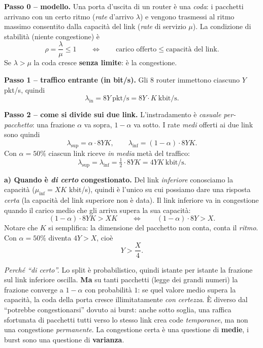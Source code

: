 \documentclass{report}
\begin{document}
\begin{solution}
\textbf{Passo 0 -- modello.} Una porta d'uscita di un router è una \emph{coda}: i
pacchetti arrivano con un certo ritmo (\emph{rate} d'arrivo $\lambda$) e vengono
trasmessi al ritmo massimo consentito dalla capacità del link (\emph{rate} di
servizio $\mu$). La condizione di stabilità (niente congestione) è
\[
\rho = \frac{\lambda}{\mu} \le 1
\qquad\Longleftrightarrow\qquad
\text{carico offerto} \le \text{capacità del link}.
\]
Se $\lambda > \mu$ la coda cresce \textbf{senza limite}: è la congestione.

\medskip
\textbf{Passo 1 -- traffico entrante (in bit/s).} Gli 8 router immettono ciascuno
$Y$ pkt/s, quindi
\[
\lambda_{\text{in}} = 8Y \ \text{pkt/s} = 8Y\cdot K \ \text{kbit/s}.
\]

\textbf{Passo 2 -- come si divide sui due link.} L'instradamento è \emph{casuale
per-pacchetto}: una frazione $\alpha$ va sopra, $1-\alpha$ va sotto. I rate
\emph{medi} offerti ai due link sono quindi
\[
\lambda_{\text{sup}} = \alpha\cdot 8YK, \qquad
\lambda_{\text{inf}} = (1-\alpha)\cdot 8YK .
\]
Con $\alpha=50\%$ ciascun link riceve \emph{in media} metà del traffico:
\[
\lambda_{\text{sup}} = \lambda_{\text{inf}} = \tfrac{1}{2}\cdot 8YK = 4YK \ \text{kbit/s}.
\]

\medskip
\noindent\textbf{a) Quando è \emph{di certo} congestionato.}
Del link \emph{inferiore} conosciamo la capacità ($\mu_{\text{inf}}=XK$ kbit/s),
quindi è l'unico su cui possiamo dare una risposta \emph{certa} (la capacità del
link superiore non è data). Il link inferiore va in congestione quando il carico
medio che gli arriva supera la sua capacità:
\[
\boxed{(1-\alpha)\cdot 8YK > XK}
\qquad\Longleftrightarrow\qquad
(1-\alpha)\cdot 8Y > X .
\]
Notare che $K$ si semplifica: la dimensione del pacchetto non conta, conta il
\emph{ritmo}. Con $\alpha=50\%$ diventa $4Y > X$, cioè
\[
Y > \frac{X}{4}.
\]

\emph{Perché ``di certo''.} Lo split è probabilistico, quindi istante per istante
la frazione sul link inferiore oscilla. \textbf{Ma} su tanti pacchetti (legge dei
grandi numeri) la frazione converge a $1-\alpha$ con probabilità $1$: se quel
valore medio supera la capacità, la coda della porta cresce illimitatamente
\emph{con certezza}. È diverso dal ``potrebbe congestionarsi'' dovuto ai burst:
anche sotto soglia, una raffica sfortunata di pacchetti tutti verso lo stesso link
crea code \emph{temporanee}, ma non una congestione \emph{permanente}. La
congestione certa è una questione di \textbf{medie}, i burst sono una questione di
\textbf{varianza}.


\end{solution}
\end{document}
